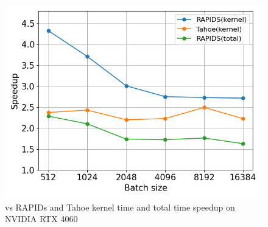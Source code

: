 \begin{figure}[htb]
  \centering
  \includegraphics[width=0.75\linewidth]{figures/geomean_speedup_4060_kernel_time_total_time.png}
  \caption{\Treebeard{} vs RAPIDs and Tahoe kernel time and total time speedup on NVIDIA RTX 4060}
  \label{Fig:TBvsRAPIDsTahoe_4060_Speedup}
\end{figure}


